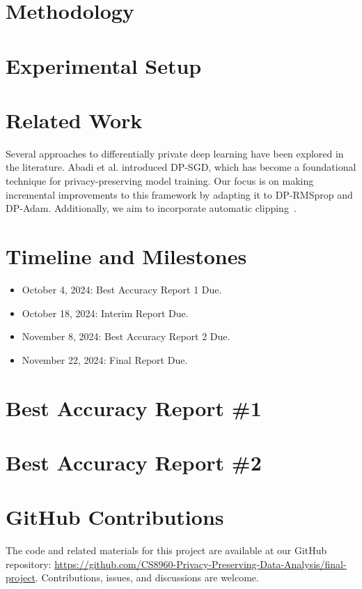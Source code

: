 \documentclass{article}
\begin{document}
    \section{Methodology}\label{sec:methodology}
    

    \break
    \section{Experimental Setup}\label{sec:experimental-setup}
    

    \section{Related Work}\label{sec:related-work}
    Several approaches to differentially private deep learning have been explored in the literature.
    Abadi et al. \cite{Abadi_2016_DeepLearningDifferentialPrivacy} introduced DP-SGD, which has become a foundational technique for
    privacy-preserving model training.
    Our focus is on making incremental improvements to this framework by adapting it to DP-RMSprop and DP-Adam.
    Additionally, we aim to incorporate automatic clipping~\cite{bu2023automaticclippingdifferentiallyprivate}.


    \section{Timeline and Milestones}\label{sec:timeline-and-milestones}
    \begin{itemize}
        \item October 4, 2024: Best Accuracy Report 1 Due.
        \item October 18, 2024: Interim Report Due.
        \item November 8, 2024: Best Accuracy Report 2 Due.
        \item November 22, 2024: Final Report Due.
    \end{itemize}

    \section{Best Accuracy Report \#1}\label{sec:best-accuracy-report}
    

    \section{Best Accuracy Report \#2}\label{sec:best-accuracy-report}
    

    
    

    \section*{GitHub Contributions}
    The code and related materials for this project are available at our GitHub repository:
    \url{https://github.com/CS8960-Privacy-Preserving-Data-Analysis/final-project}.
    Contributions, issues, and discussions are welcome.
\end{document}
